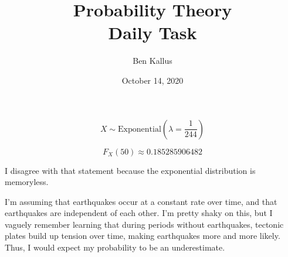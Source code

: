 \documentclass[12pt]{article}
\title{Probability Theory \\ Daily Task}
\author{Ben Kallus}
\date{October 14, 2020}
\begin{document}
\maketitle

 $$X \sim \text{Exponential}(\lambda=\frac1{244})$$

 $$F_X(50) \approx 0.185285906482$$

 I disagree with that statement because the exponential distribution is memoryless.

 I'm assuming that earthquakes occur at a constant rate over time, and that earthquakes are independent of each other. I'm pretty shaky on this, but I vaguely remember learning that during periods without earthquakes, tectonic plates build up tension over time, making earthquakes more and more likely. Thus, I would expect my probability to be an underestimate.
\end{document}
